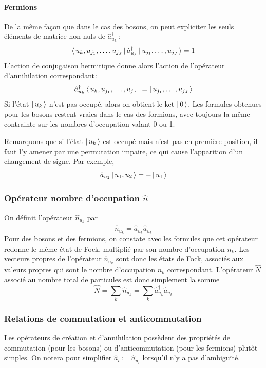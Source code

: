             \paragraph{Fermions}

            De la même façon que dans le cas des bosons, on peut expliciter les seuls éléments de matrice non nuls de $\hat{a}_{u_k}^{\dagger}$ :
            \[ \left< \, u_k, u_{j_1}, \ldots, u_{j_J} \, \right| \hat{a}_{u_k}^{\dagger} \left| \, u_{j_1}, \ldots, u_{j_J} \, \right> = 1 \] 
            L’action de conjugaison hermitique donne alors l’action de l’opérateur d’annihilation correspondant :
            \[ \hat{a}_{u_k}^{\dagger} \left< \, u_k, u_{j_1}, \ldots, u_{j_J} \, \right| = \left| \, u_{j_1}, \ldots, u_{j_J} \, \right> \]   
            Si l’état $\left| \, u_k \, \right>$ n’est pas occupé, alors on obtient le ket $\left| \, 0 \, \right>$. Les formules obtenues pour les bosons restent vraies dans le cas des formions, avec toujours la même contrainte sur les nombres d’occupation valant 0 ou 1. 

            Remarquons que si l’état $\left| \, u_k \, \right>$ est occupé mais n’est pas en première position, il faut l’y amener par une permutation impaire, ce qui cause l’apparition d’un changement de signe. Par exemple, 
            \[ \hat{a}_{u_2} \left| \, u_1, u_2 \, \right> = - \left| \, u_1 \, \right> \]   

        \subsubsection{Opérateur nombre d’occupation $\hat{n}$}

        On définit l’opérateur $\hat{n}_{u_k}$ par 
        \[ \hat{n}_{u_k} = \hat{a}_{u_k}^{\dagger} \hat{a}_{u_k} \]   
        Pour des bosons et des fermions, on constate avec les formules que cet opérateur redonne le même état de Fock, multiplié par son nombre d’occupation $n_k$. Les vecteurs propres de l’opérateur $\hat{n}_{u_k}$ sont donc les états de Fock, associés aux valeurs propres qui sont le nombre d’occupation $n_k$ correspondant. L’opérateur $\hat{N}$ associé au nombre total de particules est donc simplement la somme 
        \[ \hat{N} = \sum_{k} \hat{n}_{u_k} = \sum_{k}  \hat{a}_{u_k}^{\dagger} \hat{a}_{u_k} \]

        \subsubsection{Relations de commutation et anticommutation}

        Les opérateurs de création et d’annihilation possèdent des propriétés de commutation (pour les bosons) ou d’anticommutation (pour les fermions) plutôt simples. On notera pour simplifier $\hat{a}_i := \hat{a}_{u_i}$ lorsqu’il n’y a pas d’ambiguïté.


